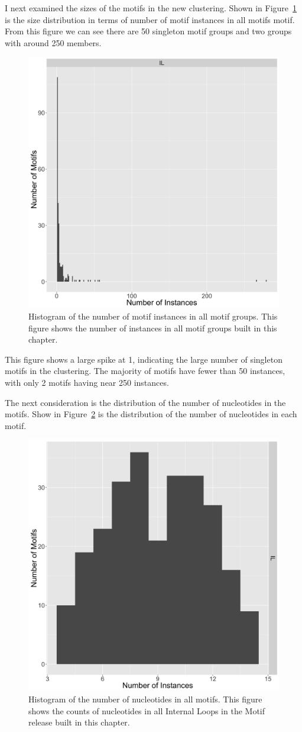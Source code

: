 I next examined the sizes of the motifs in the new clustering. Shown in
Figure~\ref{fig:num-motif-instances} is the size distribution in terms of number
of motif instances in all motifs motif. From this figure we can see there are 50
singleton motif groups and two groups with around 250 members.

\begin{figure}
  \includegraphics[width=0.5\linewidth]{chapter-5/figs/motifs/instances}
  \caption{Histogram of the number of motif instances in all motif groups. This
  figure shows the number of instances in all motif groups built in this chapter.}
  \label{fig:num-motif-instances}
\end{figure}

This figure shows a large spike at 1, indicating the large number of singleton
motifs in the clustering. The majority of motifs have fewer than 50 instances,
with only 2 motifs having near 250 instances.

The next consideration is the distribution of the number of nucleotides in the
motifs. Show in Figure~\ref{fig:num-motif-nucleotides} is the distribution of
the number of nucleotides in each motif.

\begin{figure}
  \includegraphics[width=0.5\linewidth]{chapter-5/figs/motifs/nucleotides}
  \caption{Histogram of the number of nucleotides in all motifs. This figure
  shows the counts of nucleotides in all Internal Loops in the Motif release
built in this chapter.}
  \label{fig:num-motif-nucleotides}
\end{figure}


